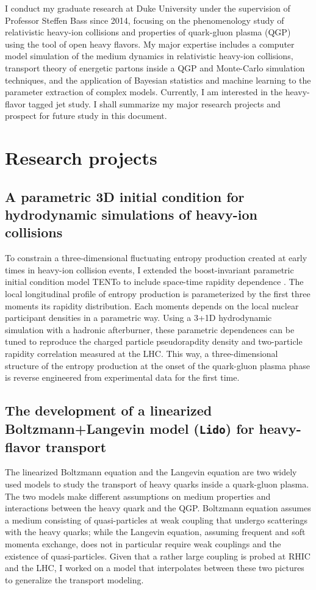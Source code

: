 \documentclass[10pt,a4paper]{article}
\begin{document}
I conduct my graduate research at Duke University under the supervision of Professor Steffen Bass since 2014, focusing on the phenomenology study of relativistic heavy-ion collisions and properties of quark-gluon plasma (QGP) using the tool of open heavy flavors.
My major expertise includes a computer model simulation of the medium dynamics in relativistic heavy-ion collisions, transport theory of energetic partons inside a QGP and Monte-Carlo simulation techniques, and the application of Bayesian statistics and machine learning to the parameter extraction of complex models.
Currently, I am interested in the heavy-flavor tagged jet study.
I shall summarize my major research projects and prospect for future study in this document.


\section{Research projects}

\subsection{A parametric 3D initial condition for hydrodynamic simulations of heavy-ion collisions}
To constrain a three-dimensional fluctuating entropy production created at early times in heavy-ion collision events, I extended the boost-invariant parametric initial condition model TENTo to include space-time rapidity dependence \cite{Ke:2016jrd}. The local longitudinal profile of entropy production is parameterized by the first three moments its rapidity distribution. Each moments depends on the local nuclear participant densities in a parametric way. Using a 3+1D hydrodynamic simulation with a hadronic afterburner, these parametric dependences can be tuned to reproduce the charged particle pseudorapdity density and two-particle rapidity correlation measured at the LHC. This way, a three-dimensional structure of the entropy production at the onset of the quark-gluon plasma phase is reverse engineered from experimental data for the first time. 

\subsection{The development of a linearized Boltzmann+Langevin model ({\tt Lido}) for heavy-flavor transport}

The linearized Boltzmann equation and the Langevin equation are two widely  used models to study the transport of heavy quarks inside a quark-gluon plasma.
The two models make different assumptions on medium properties and interactions between the heavy quark and the QGP.
Boltzmann equation assumes a medium consisting of quasi-particles at weak coupling that undergo scatterings with the heavy quarks; while the Langevin equation, assuming frequent and soft momenta exchange, does not in particular require weak couplings and the existence of quasi-particles.
Given that a rather large coupling is probed at RHIC and the LHC, I worked on a model that interpolates between these two pictures to generalize the transport modeling.
\end{document}
